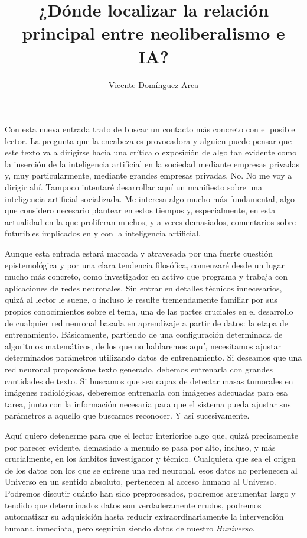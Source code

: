 \documentclass[12pt,a4paper]{article}
\title{¿Dónde localizar la relación principal entre neoliberalismo e IA?}
\author{Vicente Domínguez Arca}
\date{}
\begin{document}
\maketitle

Con esta nueva entrada trato de buscar un contacto más concreto con el posible lector. La pregunta que la encabeza es provocadora y alguien puede pensar que este texto va a dirigirse hacia una crítica o exposición de algo tan evidente como la inserción de la inteligencia artificial en la sociedad mediante empresas privadas y, muy particularmente, mediante grandes empresas privadas. No. No me voy a dirigir ahí. Tampoco intentaré desarrollar aquí un manifiesto sobre una inteligencia artificial socializada. Me interesa algo mucho más fundamental, algo que considero necesario plantear en estos tiempos y, especialmente, en esta actualidad en la que proliferan muchos, y a veces demasiados, comentarios sobre futuribles implicados en y con la inteligencia artificial.

Aunque esta entrada estará marcada y atravesada por una fuerte cuestión epistemológica y por una clara tendencia filosófica, comenzaré desde un lugar mucho más concreto, como investigador en activo que programa y trabaja con aplicaciones de redes neuronales. Sin entrar en detalles técnicos innecesarios, quizá al lector le suene, o incluso le resulte tremendamente familiar por sus propios conocimientos sobre el tema, una de las partes cruciales en el desarrollo de cualquier red neuronal basada en aprendizaje a partir de datos: la etapa de entrenamiento. Básicamente, partiendo de una configuración determinada de algoritmos matemáticos, de los que no hablaremos aquí, necesitamos ajustar determinados parámetros utilizando datos de entrenamiento. Si deseamos que una red neuronal proporcione texto generado, debemos entrenarla con grandes cantidades de texto. Si buscamos que sea capaz de detectar masas tumorales en imágenes radiológicas, deberemos entrenarla con imágenes adecuadas para esa tarea, junto con la información necesaria para que el sistema pueda ajustar sus parámetros a aquello que buscamos reconocer. Y así sucesivamente.

Aquí quiero detenerme para que el lector interiorice algo que, quizá precisamente por parecer evidente, demasiado a menudo se pasa por alto, incluso, y más crucialmente, en los ámbitos investigador y técnico. Cualquiera que sea el origen de los datos con los que se entrene una red neuronal, esos datos no pertenecen al Universo en un sentido absoluto, pertenecen al acceso humano al Universo. Podremos discutir cuánto han sido preprocesados, podremos argumentar largo y tendido que determinados datos son verdaderamente crudos, podremos automatizar su adquisición hasta reducir extraordinariamente la intervención humana inmediata, pero seguirán siendo datos de nuestro \emph{Huniverso}.
\end{document}
